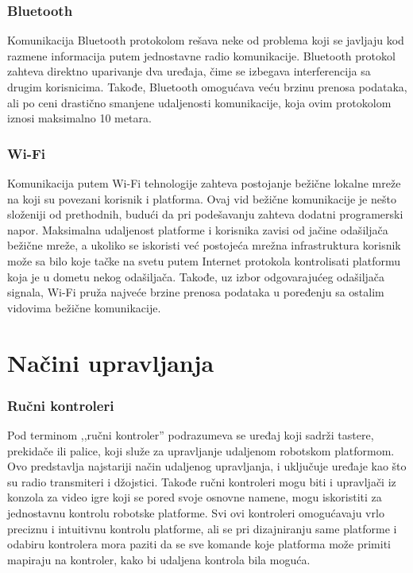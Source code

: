 \documentclass[12pt,a4paper]{report}
\begin{document}
\subsubsection{Bluetooth}

Komunikacija Bluetooth protokolom rešava neke od problema koji se javljaju kod razmene informacija putem jednostavne radio komunikacije. Bluetooth protokol zahteva direktno uparivanje dva uređaja, čime se izbegava interferencija sa drugim korisnicima. Takođe, Bluetooth omogućava veću brzinu prenosa podataka, ali po ceni drastično smanjene udaljenosti komunikacije, koja ovim protokolom iznosi maksimalno 10 metara.

\subsubsection{Wi-Fi}

Komunikacija putem Wi-Fi tehnologije zahteva postojanje bežične lokalne mreže na koji su povezani korisnik i platforma. Ovaj vid bežične komunikacije je nešto složeniji od prethodnih, budući da pri podešavanju zahteva dodatni programerski napor. Maksimalna udaljenost platforme i korisnika zavisi od jačine odašiljača bežične mreže, a ukoliko se iskoristi već postojeća mrežna infrastruktura korisnik može sa bilo koje tačke na svetu putem Internet protokola kontrolisati platformu koja je u dometu nekog odašiljača. Takođe, uz izbor odgovarajućeg odašiljača signala, Wi-Fi pruža najveće brzine prenosa podataka u poređenju sa ostalim vidovima bežične komunikacije.

\newpage

\section{Načini upravljanja}

\subsubsection{Ručni kontroleri}

Pod terminom ,,ručni kontroler'' podrazumeva se uređaj koji sadrži tastere, prekidače ili palice, koji služe za upravljanje udaljenom robotskom platformom. Ovo predstavlja najstariji način udaljenog upravljanja, i uključuje uređaje kao što su radio transmiteri i džojstici. Takođe ručni kontroleri mogu biti i upravljači iz konzola za video igre koji se pored svoje osnovne namene, mogu iskoristiti za jednostavnu kontrolu robotske platforme. Svi ovi kontroleri omogućavaju vrlo preciznu i intuitivnu kontrolu platforme, ali se pri dizajniranju same platforme i odabiru kontrolera mora paziti da se sve komande koje platforma može primiti mapiraju na kontroler, kako bi udaljena kontrola bila moguća.
\end{document}
